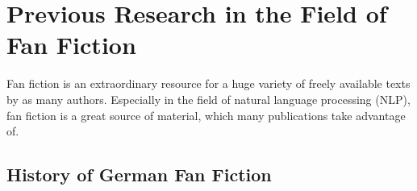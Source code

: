 \chapter{Previous Research in the Field of Fan Fiction}\label{ch:rw}

Fan fiction is an extraordinary resource for a huge variety of freely available texts by as many authors.
Especially in the field of natural language processing (NLP), fan fiction is a great source of material, which many publications take advantage of.


\section{History of German Fan Fiction}\label{sec:history-of-german-fan-fiction}

